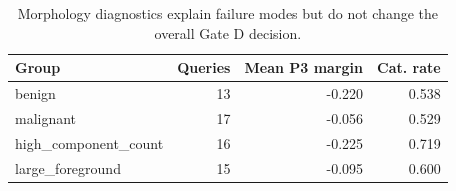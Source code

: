 \begin{table}[t]
\centering
\caption{Morphology diagnostics explain failure modes but do not change the overall Gate D decision.}
\begin{tabular}{lrrr}
\hline
Group & Queries & Mean P3 margin & Cat. rate \\
\hline
benign & 13 & -0.220 & 0.538 \\
malignant & 17 & -0.056 & 0.529 \\
high_component_count & 16 & -0.225 & 0.719 \\
large_foreground & 15 & -0.095 & 0.600 \\
\hline
\end{tabular}
\end{table}
